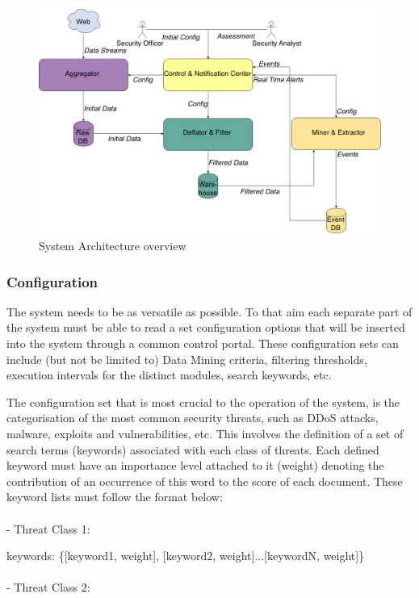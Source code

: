 \documentclass[12pt]{article}
\newcounter{subsubsubsection}[subsubsection]
\begin{document}
\begin{figure}[h]
    \centering
   \includegraphics[scale=0.33]{./images/Architecture.png}
    \caption{System Architecture overview}
    \label{fig:arch}
\end{figure}	

\newpage
\subsubsection{Configuration}
The system needs to be as versatile as possible. To that aim each separate part of the system must be able to read a set configuration options that will be inserted into the system through a common control portal. These configuration sets can include (but not be limited to) Data Mining criteria, filtering thresholds, execution intervals for the distinct modules, search keywords, etc. 


The configuration set that is most crucial to the operation of the system, is the categorisation of the most common security threats, such as DDoS attacks, malware, exploits and vulnerabilities, etc. This involves the definition of a set of search terms (keywords) associated with each class of threats. Each defined keyword must have an importance level attached to it (weight) denoting the contribution of an occurrence of this word to the score of each document. These keyword lists must follow the format below:\\\\
- Threat Class 1:

keywords: \{[keyword1, weight], [keyword2, weight]...[keywordN, weight]\}\\\\
- Threat Class 2:
\end{document}
